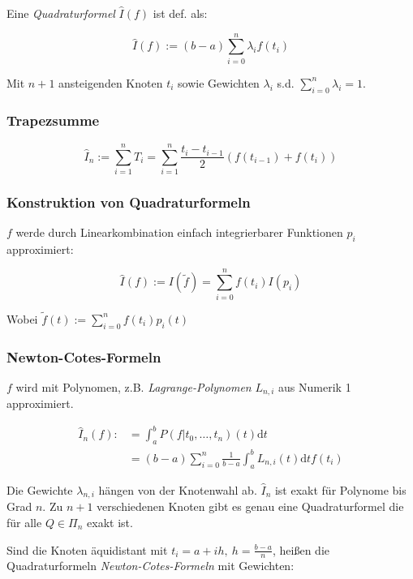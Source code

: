 Eine \emph{Quadraturformel} $\widehat I(f)$ ist def. als:

\vspace*{-2mm}
$$\widehat I(f) := (b-a)\sum_{i=0}^n \lambda_i f(t_i)$$

Mit $n+1$ ansteigenden Knoten $t_i$ sowie Gewichten $\lambda_i$ s.d. $\sum_{i=0}^n \lambda_i = 1$.

\subsubsection*{Trapezsumme}

$$\widehat I_n := \sum_{i=1}^n T_i = \sum_{i=1}^n \frac{t_i - t_{i-1}}{2}(f(t_{i-1})+f(t_i))$$

\subsubsection*{Konstruktion von Quadraturformeln}

$f$ werde durch Linearkombination einfach integrierbarer Funktionen $p_i$ approximiert:

\vspace*{-2mm}
$$\widehat I(f) := I(\tilde f) = \sum_{i=0}^n f(t_i) I(p_i)$$

Wobei $\tilde f(t) := \sum_{i=0}^n f(t_i) p_i(t)$

\subsubsection*{Newton-Cotes-Formeln}

$f$ wird mit Polynomen, z.B. \emph{Lagrange-Polynomen} $L_{n,i}$ aus Numerik 1 approximiert.

\vspace*{-4mm}
\begin{align*}
\widehat I_n(f) :&= \int_a^b P(f|t_0,\dots,t_n)(t)\text{d}t \\
&= (b-a) \sum_{i=0}^n \frac{1}{b-a} \int_a^b L_{n,i}(t)\text{d}t f(t_i)
\end{align*}

Die Gewichte $\lambda_{n,i}$ hängen von der Knotenwahl ab. $\widehat I_n$ ist exakt für Polynome bis Grad $n$. Zu $n+1$ verschiedenen Knoten gibt es genau eine Quadraturformel die für alle $Q \in \Pi_n$ exakt ist.

\spacing

Sind die Knoten äquidistant mit $t_i = a + ih, \ h=\frac{b-a}{n}$, heißen die Quadraturformeln \emph{Newton-Cotes-Formeln} mit Gewichten:

